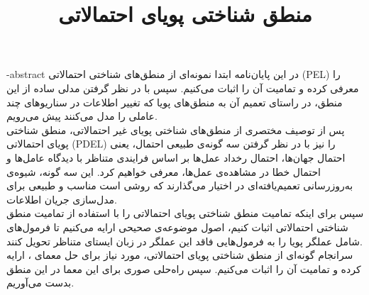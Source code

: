 \subject{ریاضی }
\title{منطق شناختی پویای احتمالاتی}
\fa-abstract{\noindent
در این پایان‌نامه ابتدا نمونه‌ای از منطق‌های شناختی احتمالاتی (PEL) را معرفی کرده و تمامیت آن را اثبات می‌کنیم. سپس با در نظر گرفتن مدلی ساده‌ از این منطق، در راستای تعمیم آن به منطق‌های پویا که تغییر اطلاعات در سناریوهای چند عاملی را مدل می‌کنند پیش می‌رویم.
\\
پس از توصیف مختصری از منطق‌های شناختی پویای غیر احتمالاتی، منطق شناختی پویای احتمالاتی (PDEL) را نیز با در نظر گرفتن سه گونه‌ی طبیعی احتمال، یعنی احتمال {\prior} جهان‌ها، احتمال رخداد عمل‌ها بر اساس فرایندی متناظر با دیدگاه عامل‌ها و احتمال خطا در مشاهده‌ی عمل‌ها، معرفی خواهیم کرد. این سه گونه، شیوه‌ی به‌روزرسانی تعمیم‌یافته‌ای در اختیار می‌گذارند که روشی است مناسب و طبیعی برای مدل‌سازی جریان اطلاعات.
\\
سپس برای اینکه تمامیت منطق شناختی پویای احتمالاتی را با استفاده از تمامیت منطق شناختی احتمالاتی اثبات کنیم، اصول موضوعه‌ی صحیحی ارایه می‌کنیم تا فرمول‌های شامل عملگر پویا را به فرمول‌هایی فاقد این عملگر در زبان ایستای متناظر تحویل کنند.
\\
سرانجام گونه‌ای از منطق شناختی پویای احتمالاتی، مورد نیاز برای حل معمای \!\!\! ، ارایه کرده و تمامیت آن را اثبات می‌کنیم. سپس راه‌حلی صوری برای این معما در این منطق بدست می‌آوریم. 
}
\newpage
\thispagestyle{empty}
\vtitle
\newpage
\thispagestyle{empty}
\clearpage
~~~
\newpage
\thispagestyle{empty}

\newpage
\thispagestyle{empty}
\clearpage
~~~
